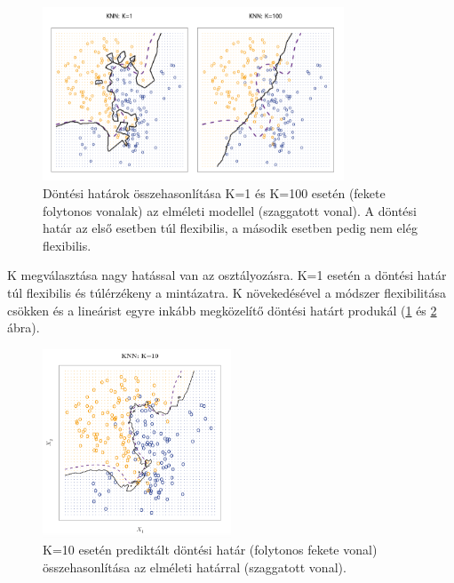 \documentclass[12pt]{article}
\theoremstyle{plain}
\begin{document}
\begin{figure}
    \begin{center}
    \includegraphics[width=0.8\textwidth]{media/knn2.png}
    \caption{Döntési határok összehasonlítása K=1 és K=100 esetén (fekete folytonos vonalak) az elméleti modellel (szaggatott vonal). A döntési határ az első esetben túl flexibilis, a második esetben pedig nem elég flexibilis. } 
    \label{knn2}
    \end{center}
\end{figure}

K megválasztása nagy hatással van az osztályozásra. K=1 esetén a döntési határ túl flexibilis és túlérzékeny a mintázatra. K növekedésével a módszer flexibilitása csökken és a lineárist egyre inkább megközelítő döntési határt produkál (\ref{knn2} és \ref{knn3} ábra). 

\begin{figure}
    \begin{center}
    \includegraphics[width=0.5\textwidth]{media/knn3.png}
    \caption{K=10 esetén prediktált döntési határ (folytonos fekete vonal) összehasonlítása az elméleti határral (szaggatott vonal). } 
    \label{knn3}
    \end{center}
\end{figure}
\end{document}
